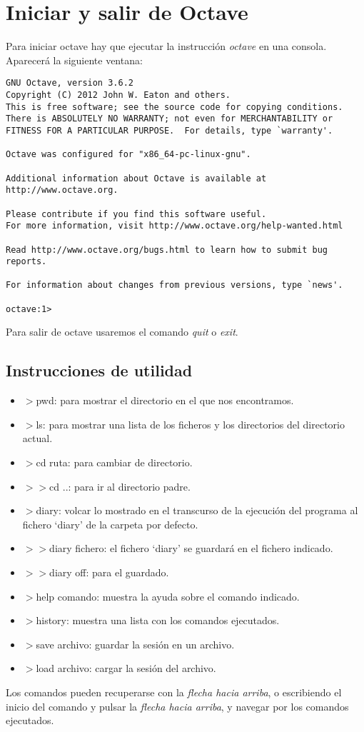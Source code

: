 \documentclass[a4,12pt,graphicx,caption,rotating]{article}
\begin{document}
\section{Iniciar y salir de Octave}
Para iniciar octave hay que ejecutar la instrucción \emph{octave} en una consola. Aparecerá la siguiente ventana:
\begin{verbatim}
GNU Octave, version 3.6.2
Copyright (C) 2012 John W. Eaton and others.
This is free software; see the source code for copying conditions.
There is ABSOLUTELY NO WARRANTY; not even for MERCHANTABILITY or
FITNESS FOR A PARTICULAR PURPOSE.  For details, type `warranty'.

Octave was configured for "x86_64-pc-linux-gnu".

Additional information about Octave is available at http://www.octave.org.

Please contribute if you find this software useful.
For more information, visit http://www.octave.org/help-wanted.html

Read http://www.octave.org/bugs.html to learn how to submit bug reports.

For information about changes from previous versions, type `news'.

octave:1>
\end{verbatim}

Para salir de octave usaremos el comando \emph{quit} o \emph{exit}.

\subsection{Instrucciones de utilidad}
\begin{itemize}
\item$>$pwd: para mostrar el directorio en el que nos encontramos.
\item$>$ls: para mostrar una lista de los ficheros y los directorios del directorio actual.
\item$>$cd ruta: para cambiar de directorio.
\item$>>$cd ..: para ir al directorio padre.
\item$>$diary: volcar lo mostrado en el transcurso de la ejecución del programa al fichero ‘diary’ de la carpeta por defecto.
\item$>>$diary fichero: el fichero ‘diary’ se guardará en el fichero indicado.
\item$>>$diary off: para el guardado.
\item$>$help comando: muestra la ayuda sobre el comando indicado.
\item$>$history: muestra una lista con los comandos ejecutados.
\item$>$save archivo: guardar la sesión en un archivo.
\item$>$load archivo: cargar la sesión del archivo.
\end{itemize}
Los comandos pueden recuperarse con la \emph{flecha hacia arriba}, o escribiendo el inicio del comando y pulsar la \emph{flecha hacia arriba}, y navegar por los comandos ejecutados.
\end{document}
